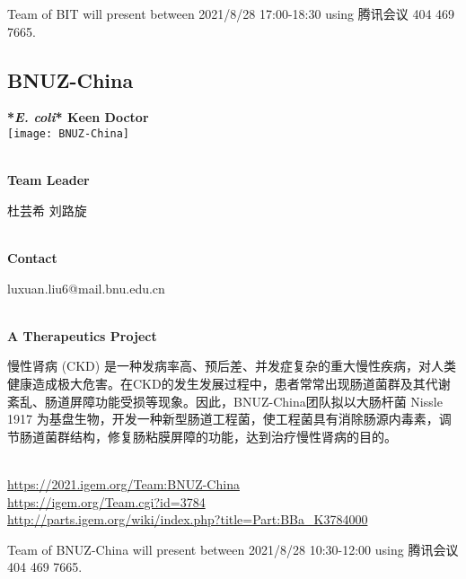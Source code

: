 \vfill{}









Team of BIT will present between        2021/8/28 17:00-18:30 using 腾讯会议 404 469 7665.
\newpage


\subsection{\textcolor{Blu}{ BNUZ-China } }
\vspace{5mm}
\begin{center}
\large{
  \textbf{ *\textit{E. coli}* Keen Doctor }\\

  \texttt{[image: BNUZ-China]}
}
\end{center}
\textbf{\\Team Leader}

  杜芸希
  刘路旋


\textbf{\\Contact}

  luxuan.liu6@mail.bnu.edu.cn


\textbf{\\A Therapeutics Project\\}\begin{spacing}{1.5}

慢性肾病 (CKD) 是一种发病率高、预后差、并发症复杂的重大慢性疾病，对人类健康造成极大危害。在CKD的发生发展过程中，患者常常出现肠道菌群及其代谢紊乱、肠道屏障功能受损等现象。因此，BNUZ-China团队拟以大肠杆菌 Nissle 1917 为基盘生物，开发一种新型肠道工程菌，使工程菌具有消除肠源内毒素，调节肠道菌群结构，修复肠粘膜屏障的功能，达到治疗慢性肾病的目的。\end{spacing}
\\

\url{https://2021.igem.org/Team:BNUZ-China }\\
\url{https://igem.org/Team.cgi?id=3784 }\\
\url{http://parts.igem.org/wiki/index.php?title=Part:BBa_K3784000 }\\


\vfill{}









Team of BNUZ-China will present between     2021/8/28 10:30-12:00    using 腾讯会议 404 469 7665.
\newpage


